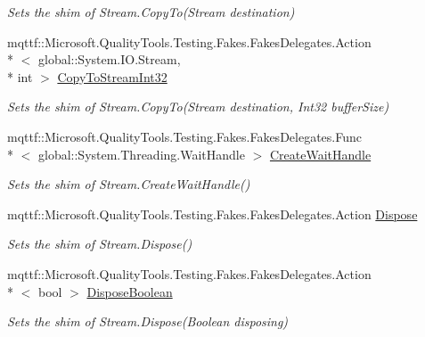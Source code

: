 \begin{DoxyCompactItemize}
\begin{DoxyCompactList}\small\item\em Sets the shim of Stream.\-Copy\-To(\-Stream destination)\end{DoxyCompactList}\item 
mqttf\-::\-Microsoft.\-Quality\-Tools.\-Testing.\-Fakes.\-Fakes\-Delegates.\-Action\\*
$<$ global\-::\-System.\-I\-O.\-Stream, \\*
int $>$ \hyperlink{class_system_1_1_i_o_1_1_fakes_1_1_shim_stream_af7e13a283a2c86dae8721867c05f0595}{Copy\-To\-Stream\-Int32}
\begin{DoxyCompactList}\small\item\em Sets the shim of Stream.\-Copy\-To(\-Stream destination, Int32 buffer\-Size)\end{DoxyCompactList}\item 
mqttf\-::\-Microsoft.\-Quality\-Tools.\-Testing.\-Fakes.\-Fakes\-Delegates.\-Func\\*
$<$ global\-::\-System.\-Threading.\-Wait\-Handle $>$ \hyperlink{class_system_1_1_i_o_1_1_fakes_1_1_shim_stream_a88090cfa304353328bb52d63eb81612b}{Create\-Wait\-Handle}
\begin{DoxyCompactList}\small\item\em Sets the shim of Stream.\-Create\-Wait\-Handle()\end{DoxyCompactList}\item 
mqttf\-::\-Microsoft.\-Quality\-Tools.\-Testing.\-Fakes.\-Fakes\-Delegates.\-Action \hyperlink{class_system_1_1_i_o_1_1_fakes_1_1_shim_stream_a05c348a628984b846494a4225f3698a7}{Dispose}
\begin{DoxyCompactList}\small\item\em Sets the shim of Stream.\-Dispose()\end{DoxyCompactList}\item 
mqttf\-::\-Microsoft.\-Quality\-Tools.\-Testing.\-Fakes.\-Fakes\-Delegates.\-Action\\*
$<$ bool $>$ \hyperlink{class_system_1_1_i_o_1_1_fakes_1_1_shim_stream_aa9b452cdee2a521df7df2f88096dbc5f}{Dispose\-Boolean}
\begin{DoxyCompactList}\small\item\em Sets the shim of Stream.\-Dispose(\-Boolean disposing)\end{DoxyCompactList}\item 

\end{DoxyCompactItemize}
